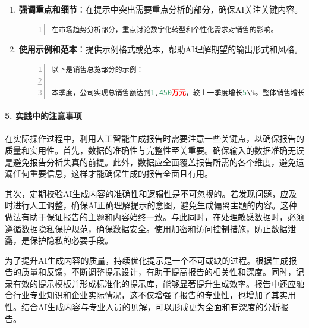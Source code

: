\begin{enumerate}
\begin{lstlisting}[language={python},label={},caption={}, basicstyle=\footnotesize\ttfamily, breaklines=true, numbers=left, frame=single]
依此类推，逐步生成报告各部分内容。
\end{lstlisting}
    
    \item \textbf{强调重点和细节}：在提示中突出需要重点分析的部分，确保AI关注关键内容。
    
    \begin{lstlisting}[language={python},label={},caption={}, basicstyle=\footnotesize\ttfamily, breaklines=true, numbers=left, frame=single]
在市场趋势分析部分，重点讨论数字化转型和个性化需求对销售的影响。
\end{lstlisting}
    
    \item \textbf{使用示例和范本}：提供示例格式或范本，帮助AI理解期望的输出形式和风格。
    
    \begin{lstlisting}[language={python},label={},caption={}, basicstyle=\footnotesize\ttfamily, breaklines=true, numbers=left, frame=single]
以下是销售总览部分的示例：

本季度，公司实现总销售额达到1,450万元，较上一季度增长5\%。整体销售增长率为5\%，显示出稳定的增长态势。总体利润率为12.75\%，较上一季度有所提升，表明公司在成本控制和销售策略上取得了一定成效。
\end{lstlisting}
\end{enumerate}

\paragraph{5. 实践中的注意事项}

在实际操作过程中，利用人工智能生成报告时需要注意一些关键点，以确保报告的质量和实用性。首先，数据的准确性与完整性至关重要。确保输入的数据准确无误是避免报告分析失真的前提。此外，数据应全面覆盖报告所需的各个维度，避免遗漏任何重要信息，这样才能确保生成的报告全面且有用。

其次，定期校验AI生成内容的准确性和逻辑性是不可忽视的。若发现问题，应及时进行人工调整，确保AI正确理解提示的意图，避免生成偏离主题的内容。这种做法有助于保证报告的主题和内容始终一致。与此同时，在处理敏感数据时，必须遵循数据隐私保护规范，确保数据安全。使用加密和访问控制措施，防止数据泄露，是保护隐私的必要手段。

为了提升AI生成内容的质量，持续优化提示是一个不可或缺的过程。根据生成报告的质量和反馈，不断调整提示设计，有助于提高报告的相关性和深度。同时，记录有效的提示模板并形成标准化的提示库，能够显著提升生成效率。报告中还应融合行业专业知识和企业实际情况，这不仅增强了报告的专业性，也增加了其实用性。结合AI生成内容与专业人员的见解，可以形成更为全面和有深度的分析报告。

